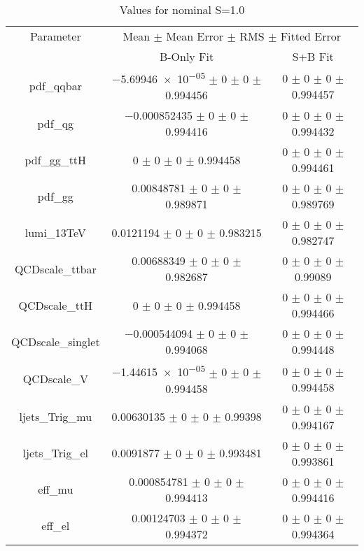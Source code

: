 \begin{table}
\centering
\caption{Values for nominal S=1.0}
\begin{tabular}{ccc}
\toprule
Parameter 	& \multicolumn{2}{c}{Mean $\pm$ Mean Error $\pm$ RMS $\pm$ Fitted Error}\\
 	& B-Only Fit & S+B Fit\\
\midrule
pdf\_qqbar 	& \num{-5.69946e-05} $\pm$ \num{0} $\pm$ \num{0} $\pm$ \num{0.994456} 	& \num{0} $\pm$ \num{0} $\pm$ \num{0} $\pm$ \num{0.994457}\\
pdf\_qg 	& \num{-0.000852435} $\pm$ \num{0} $\pm$ \num{0} $\pm$ \num{0.994416} 	& \num{0} $\pm$ \num{0} $\pm$ \num{0} $\pm$ \num{0.994432}\\
pdf\_gg\_ttH 	& \num{0} $\pm$ \num{0} $\pm$ \num{0} $\pm$ \num{0.994458} 	& \num{0} $\pm$ \num{0} $\pm$ \num{0} $\pm$ \num{0.994461}\\
pdf\_gg 	& \num{0.00848781} $\pm$ \num{0} $\pm$ \num{0} $\pm$ \num{0.989871} 	& \num{0} $\pm$ \num{0} $\pm$ \num{0} $\pm$ \num{0.989769}\\
lumi\_13TeV 	& \num{0.0121194} $\pm$ \num{0} $\pm$ \num{0} $\pm$ \num{0.983215} 	& \num{0} $\pm$ \num{0} $\pm$ \num{0} $\pm$ \num{0.982747}\\
QCDscale\_ttbar 	& \num{0.00688349} $\pm$ \num{0} $\pm$ \num{0} $\pm$ \num{0.982687} 	& \num{0} $\pm$ \num{0} $\pm$ \num{0} $\pm$ \num{0.99089}\\
QCDscale\_ttH 	& \num{0} $\pm$ \num{0} $\pm$ \num{0} $\pm$ \num{0.994458} 	& \num{0} $\pm$ \num{0} $\pm$ \num{0} $\pm$ \num{0.994466}\\
QCDscale\_singlet 	& \num{-0.000544094} $\pm$ \num{0} $\pm$ \num{0} $\pm$ \num{0.994068} 	& \num{0} $\pm$ \num{0} $\pm$ \num{0} $\pm$ \num{0.994448}\\
QCDscale\_V 	& \num{-1.44615e-05} $\pm$ \num{0} $\pm$ \num{0} $\pm$ \num{0.994458} 	& \num{0} $\pm$ \num{0} $\pm$ \num{0} $\pm$ \num{0.994458}\\
ljets\_Trig\_mu 	& \num{0.00630135} $\pm$ \num{0} $\pm$ \num{0} $\pm$ \num{0.99398} 	& \num{0} $\pm$ \num{0} $\pm$ \num{0} $\pm$ \num{0.994167}\\
ljets\_Trig\_el 	& \num{0.0091877} $\pm$ \num{0} $\pm$ \num{0} $\pm$ \num{0.993481} 	& \num{0} $\pm$ \num{0} $\pm$ \num{0} $\pm$ \num{0.993861}\\
eff\_mu 	& \num{0.000854781} $\pm$ \num{0} $\pm$ \num{0} $\pm$ \num{0.994413} 	& \num{0} $\pm$ \num{0} $\pm$ \num{0} $\pm$ \num{0.994416}\\
eff\_el 	& \num{0.00124703} $\pm$ \num{0} $\pm$ \num{0} $\pm$ \num{0.994372} 	& \num{0} $\pm$ \num{0} $\pm$ \num{0} $\pm$ \num{0.994364}\\

\end{tabular}
\end{table}
